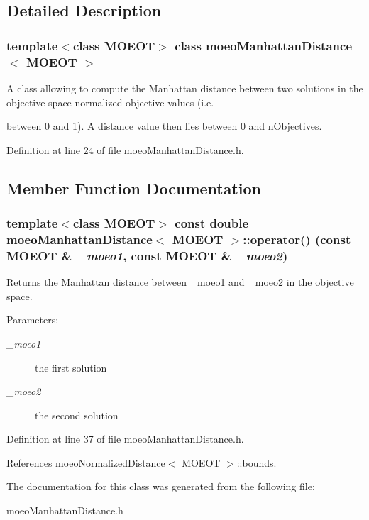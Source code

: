 \subsection{Detailed Description}
\subsubsection*{template$<$class MOEOT$>$ class moeo\-Manhattan\-Distance$<$ MOEOT $>$}

A class allowing to compute the Manhattan distance between two solutions in the objective space normalized objective values (i.e. 

between 0 and 1). A distance value then lies between 0 and n\-Objectives. 



Definition at line 24 of file moeo\-Manhattan\-Distance.h.

\subsection{Member Function Documentation}
\subsubsection{\setlength{\rightskip}{0pt plus 5cm}template$<$class MOEOT$>$ const double \bf{moeo\-Manhattan\-Distance}$<$ MOEOT $>$::operator() (const MOEOT \& {\em \_\-moeo1}, const MOEOT \& {\em \_\-moeo2})\hspace{0.3cm}{\tt  [inline]}}\label{classmoeoManhattanDistance_dcabb2bddb46439a47cd1af5dd124f92}


Returns the Manhattan distance between \_\-moeo1 and \_\-moeo2 in the objective space. 

\begin{Desc}
\item[Parameters:]
\begin{description}
\item[{\em \_\-moeo1}]the first solution \item[{\em \_\-moeo2}]the second solution \end{description}
\end{Desc}


Definition at line 37 of file moeo\-Manhattan\-Distance.h.

References moeo\-Normalized\-Distance$<$ MOEOT $>$::bounds.

The documentation for this class was generated from the following file:\begin{CompactItemize}
\item 
moeo\-Manhattan\-Distance.h\end{CompactItemize}
